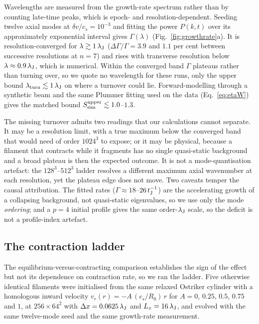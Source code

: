 \documentclass[usenatbib,twoside,twocolumn]{mnras}
\begin{document}
Wavelengths are measured from the growth-rate spectrum rather than by counting late-time peaks, which is epoch- and resolution-dependent. Seeding twelve axial modes at $\delta v/c_s=10^{-3}$ and fitting the power $P(k,t)$ over its approximately exponential interval gives $\Gamma(\lambda)$ (Fig.~\ref{fig:growthrate}a). It is resolution-converged for $\lambda\gtrsim1\,\lambda_{\rm J}$ ($\Delta\Gamma/\Gamma=3.9$ and $1.1$ per cent between successive resolutions at $n=7$) and rises with transverse resolution below $\lambda\approx0.9\,\lambda_{\rm J}$, which is numerical. Within the converged band $\Gamma$ plateaus rather than turning over, so we quote no wavelength for these runs, only the upper bound $\lambda_{\rm turn}\lesssim1\,\lambda_{\rm J}$ on where a turnover could lie. Forward-modelling through a synthetic beam and the same Plummer fitting used on the data (Eq.~\ref{eq:etaW}) gives the matched bound $S_{\rm sim}^{\rm upper}\lesssim1.0$--$1.3$.

The missing turnover admits two readings that our calculations cannot separate. It may be a resolution limit, with a true maximum below the converged band that would need of order $1024^3$ to expose; or it may be physical, because a filament that contracts while it fragments has no single quasi-static background and a broad plateau is then the expected outcome. It is not a mode-quantisation artefact: the $128^3$--$512^3$ ladder resolves a different maximum axial wavenumber at each resolution, yet the plateau edge does not move. Two caveats temper the causal attribution. The fitted rates ($\Gamma\approx18$--$26\,t_{\rm J}^{-1}$) are the accelerating growth of a collapsing background, not quasi-static eigenvalues, so we use only the mode \emph{ordering}; and a $p=4$ initial profile gives the same order-$\lambda_{\rm J}$ scale, so the deficit is not a profile-index artefact.

\subsection{The contraction ladder}
\label{sec:ladder}

The equilibrium-versus-contracting comparison establishes the sign of the effect but not its dependence on contraction rate, so we ran the ladder. Five otherwise identical filaments were initialised from the same relaxed Ostriker cylinder with a homologous inward velocity $v_r(r)=-A\,(c_s/R_0)\,r$ for $A=0$, $0.25$, $0.5$, $0.75$ and $1$, at $256\times64^2$ with $\Delta x=0.0625\,\lambda_{\rm J}$ and $L_x=16\,\lambda_{\rm J}$, and evolved with the same twelve-mode seed and the same growth-rate measurement.
\end{document}
